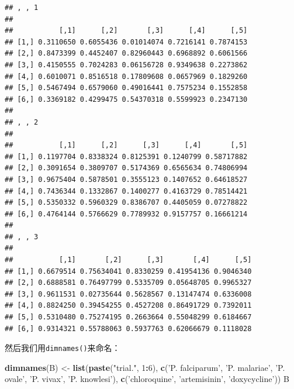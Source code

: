 \documentclass[]{book}
\newenvironment{Shaded}{\begin{snugshade}}{\end{snugshade}}
\newcommand{\DecValTok}[1]{\textcolor[rgb]{0.00,0.00,0.81}{#1}}
\newcommand{\KeywordTok}[1]{\textcolor[rgb]{0.13,0.29,0.53}{\textbf{#1}}}
\newcommand{\NormalTok}[1]{#1}
\newcommand{\OperatorTok}[1]{\textcolor[rgb]{0.81,0.36,0.00}{\textbf{#1}}}
\newcommand{\StringTok}[1]{\textcolor[rgb]{0.31,0.60,0.02}{#1}}
\begin{document}
\begin{verbatim}
## , , 1
## 
##           [,1]      [,2]       [,3]      [,4]      [,5]
## [1,] 0.3110650 0.6055436 0.01014074 0.7216141 0.7874153
## [2,] 0.8473399 0.4452407 0.82960443 0.6968892 0.6061566
## [3,] 0.4150555 0.7024283 0.06156728 0.9349638 0.2273862
## [4,] 0.6010071 0.8516518 0.17809608 0.0657969 0.1829260
## [5,] 0.5467494 0.6579060 0.49016441 0.7575234 0.1552858
## [6,] 0.3369182 0.4299475 0.54370318 0.5599923 0.2347130
## 
## , , 2
## 
##           [,1]      [,2]      [,3]      [,4]       [,5]
## [1,] 0.1197704 0.8338324 0.8125391 0.1240799 0.58717882
## [2,] 0.3091654 0.3809707 0.5174369 0.6565634 0.74806994
## [3,] 0.9675404 0.5878501 0.3555123 0.1407652 0.64618527
## [4,] 0.7436344 0.1332867 0.1400277 0.4163729 0.78514421
## [5,] 0.5350332 0.5960329 0.8386707 0.4405059 0.07278822
## [6,] 0.4764144 0.5766629 0.7789932 0.9157757 0.16661214
## 
## , , 3
## 
##           [,1]       [,2]      [,3]       [,4]      [,5]
## [1,] 0.6679514 0.75634041 0.8330259 0.41954136 0.9046340
## [2,] 0.6888581 0.76497799 0.5335709 0.05648705 0.9965327
## [3,] 0.9611531 0.02735644 0.5628567 0.13147474 0.6336008
## [4,] 0.8824250 0.39454255 0.4527208 0.86491729 0.7392011
## [5,] 0.5310480 0.75274195 0.2663664 0.55048299 0.6184667
## [6,] 0.9314321 0.55788063 0.5937763 0.62066679 0.1118028
\end{verbatim}

然后我们用\texttt{dimnames()}来命名：

\begin{Shaded}
\begin{Highlighting}[]
\KeywordTok{dimnames}\NormalTok{(B) <-}\StringTok{ }\KeywordTok{list}\NormalTok{(}\KeywordTok{paste}\NormalTok{(}\StringTok{"trial."}\NormalTok{, }\DecValTok{1}\OperatorTok{:}\DecValTok{6}\NormalTok{), }\KeywordTok{c}\NormalTok{(}\StringTok{'P. falciparum'}\NormalTok{, }\StringTok{'P. malariae'}\NormalTok{, }\StringTok{'P. ovale'}\NormalTok{, }\StringTok{'P. vivax'}\NormalTok{, }\StringTok{'P. knowlesi'}\NormalTok{), }\KeywordTok{c}\NormalTok{(}\StringTok{'chloroquine'}\NormalTok{, }\StringTok{'artemisinin'}\NormalTok{, }\StringTok{'doxycycline'}\NormalTok{))}
\NormalTok{B}
\end{Highlighting}
\end{Shaded}
\end{document}
